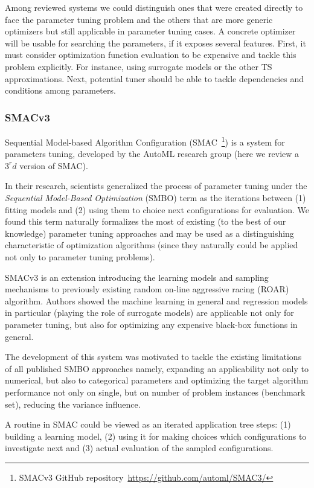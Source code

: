 Among reviewed systems we could distinguish ones that were created directly to face the parameter tuning problem and the others that are more generic optimizers but still applicable in parameter tuning cases.
A concrete optimizer will be usable for searching the parameters, if it exposes several features. First, it must consider optimization function evaluation to be expensive and tackle this problem explicitly. For instance, using surrogate models or the other TS approximations. Next, potential tuner should be able to tackle dependencies and conditions among parameters.

\subsubsection{SMACv3~\cite{hutter2011sequential}}\label{bg: smac}
Sequential Model-based Algorithm Configuration (SMAC~\footnote{SMACv3 GitHub repository~\url{https://github.com/automl/SMAC3/}}) is a system for parameters tuning, developed by the AutoML research group (here we review a $3^rd$ version of SMAC). 

In their research, scientists generalized the process of parameter tuning under the  \emph{Sequential Model-Based Optimization} (SMBO) term as the iterations between (1) fitting models and (2) using them to choice next configurations for evaluation. 
We found this term naturally formalizes the most of existing (to the best of our knowledge) parameter tuning approaches and may be used as a distinguishing characteristic of optimization algorithms (since they naturally could be applied not only to parameter tuning problems).

SMACv3 is an extension introducing the learning models and sampling mechanisms to previously existing random on-line aggressive racing (ROAR) algorithm. Authors showed the machine learning in general and regression models in particular (playing the role of surrogate models) are applicable not only for parameter tuning, but also for optimizing any expensive black-box functions in general. 

The development of this system was motivated to tackle the existing limitations of all published SMBO approaches namely, expanding an applicability not only to numerical, but also to categorical parameters and optimizing the target algorithm performance not only on single, but on number of problem instances (benchmark set), reducing the variance influence.

A routine in SMAC could be viewed as an iterated application tree steps: (1) building a learning model, (2) using it for making choices which configurations to investigate next and (3) actual evaluation of the sampled configurations.

